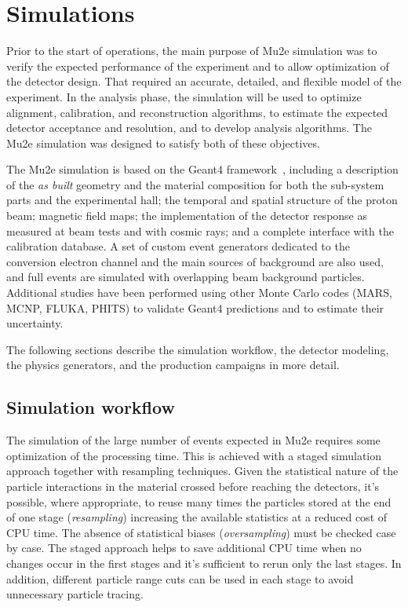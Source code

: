\section{Simulations}
\label{sec:simulation}

Prior to the start of operations, the main purpose of Mu2e simulation was to verify the expected performance of the experiment and to allow optimization of the detector design. That required an accurate, detailed, and flexible model of the experiment. In the analysis phase, the simulation will be used to optimize alignment, calibration, and reconstruction algorithms, to estimate the expected detector acceptance and resolution, and to develop analysis algorithms. The Mu2e simulation was designed to satisfy both of these objectives.

The Mu2e simulation is based on the Geant4 framework~\cite{geant4:2003,geant4:2006,geant4:2016}, including a description of the {\em as built} geometry and the material composition for both the sub-system parts and the experimental hall; the temporal and spatial structure of the proton beam; magnetic field maps; the implementation of the detector response as measured at beam tests and with cosmic rays; and a complete interface with the calibration database. A set of custom event generators dedicated to the conversion electron channel and the main sources of background are also used, and full events are simulated with overlapping beam background particles. Additional studies have been performed using other Monte Carlo codes (MARS\cite{MARS:2009}, MCNP\cite{MARS:2009, MCNP:2012}, FLUKA\cite{FLUKA:2013}, PHITS\cite{PHITS:2018}) to validate Geant4 predictions and to estimate their uncertainty.

The following sections describe the simulation workflow, the detector modeling, the physics generators, and the production campaigns in more detail.


\subsection{Simulation workflow}
The simulation of the large number of events expected in Mu2e requires some optimization of the processing time. This is achieved with a staged simulation approach together with resampling techniques. Given the statistical nature of the particle interactions in the material crossed before reaching the detectors, it's possible, where appropriate, to reuse many times the particles stored at the end of one stage ({\em resampling}) increasing the available statistics at a reduced cost of CPU time. The absence of statistical biases ({\em oversampling}) must be checked case by case. The staged approach helps to save additional CPU time when no changes occur in the first stages and it's sufficient to rerun only the last stages. In addition, different particle range cuts can be used in each stage to avoid unnecessary particle tracing. 

